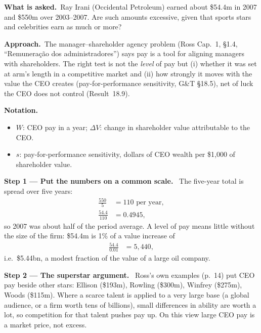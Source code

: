\documentclass[11pt,a4paper]{article}
\newcommand{\notation}{\par\noindent\textbf{Notation.}}
\newcommand{\step}[2]{\par\medskip\noindent\textbf{Step #1 --- #2.}~}
\newcommand{\asked}{\par\medskip\noindent\textbf{What is asked.}~}
\newcommand{\approach}{\par\smallskip\noindent\textbf{Approach.}~}
\newcommand{\pt}{\foreignlanguage{brazilian}}
\begin{document}
\asked Ray Irani (Occidental Petroleum) earned about \$54.4m in 2007 and \$550m over 2003--2007. Are such amounts excessive, given that sports stars and celebrities earn as much or more?

\approach The manager--shareholder agency problem (Ross Cap.~1, \S1.4, ``\pt{Remunera\c{c}\~ao dos administradores}'') says pay is a tool for aligning managers with shareholders. The right test is not the \emph{level} of pay but (i) whether it was set at arm's length in a competitive market and (ii) how strongly it moves with the value the CEO creates (pay-for-performance sensitivity, G\&T \S18.5), net of luck the CEO does not control (Result~18.9).

\notation
\begin{itemize}
  \item $W$: CEO pay in a year; $\Delta V$: change in shareholder value attributable to the CEO.
  \item $s$: pay-for-performance sensitivity, dollars of CEO wealth per \$1{,}000 of shareholder value.
\end{itemize}

\step{1}{Put the numbers on a common scale} The five-year total is spread over five years:
\begin{align}
  \frac{550}{5} &= 110 \text{ per year}, \label{r8be1-avg}\\
  \frac{54.4}{110} &= 0.4945, \nonumber
\end{align}
so 2007 was about half of the period average. A level of pay means little without the size of the firm: \$54.4m is 1\% of a value increase of
\begin{align}
  \frac{54.4}{0.01} &= 5{,}440, \label{r8be1-scale}
\end{align}
i.e.\ \$5.44bn, a modest fraction of the value of a large oil company.

\step{2}{The superstar argument} Ross's own examples (p.~14) put CEO pay beside other stars: Ellison (\$193m), Rowling (\$300m), Winfrey (\$275m), Woods (\$115m). Where a scarce talent is applied to a very large base (a global audience, or a firm worth tens of billions), small differences in ability are worth a lot, so competition for that talent pushes pay up. On this view large CEO pay is a market price, not excess.
\end{document}
